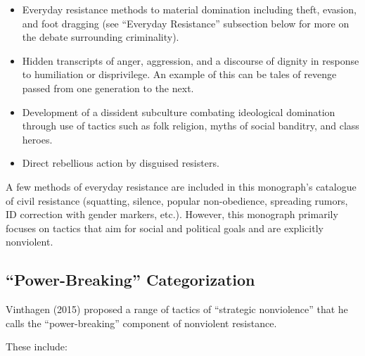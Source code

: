 \documentclass[twoside,a4paper,12pt,fleqn,openany]{extbook}
\begin{document}
\begin{itemize}
\item Everyday resistance methods to material domination including theft, evasion, and foot dragging (see “Everyday Resistance” subsection below for more on the debate surrounding criminality).
\item Hidden transcripts of anger, aggression, and a discourse of dignity in response to humiliation or disprivilege. An example of this can be tales of revenge passed from one generation to the next.
\item Development of a dissident subculture combating ideological domination through use of tactics such as folk religion, myths of social banditry, and class heroes.
\item Direct rebellious action by disguised resisters.
\end{itemize}

A few methods of everyday resistance are included in this monograph’s catalogue of civil resistance (squatting, silence, popular non-obedience, spreading rumors, ID correction with gender markers, etc.). However, this monograph primarily focuses on tactics that aim for social and political goals and are explicitly nonviolent.

\subsection*{“Power-Breaking” Categorization}

Vinthagen (2015) proposed a range of tactics of “strategic nonviolence” that he calls the “power-breaking” component of nonviolent resistance.

These include:
\end{document}
